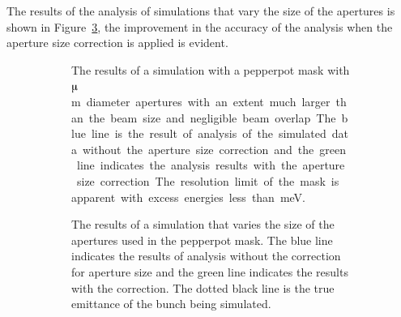 The results of the analysis of simulations that vary the size of the apertures is shown in Figure~\ref{figure:aperture_size_sim}, the improvement in the accuracy of the analysis when the aperture size correction is applied is evident.

\begin{figure}
\begin{subfigure}[b]{\textwidth}
    \center
    
    \caption[Results of a simulation investigating the efficacy of the aperture size correction for various electron excess energies.]{The results of a simulation with a pepperpot mask with \unit[50]{$\muup$m} diameter apertures with an extent much larger than the beam size and negligible beam overlap. The blue line is the result of analysis of the simulated data without the aperture size correction and the green line indicates the analysis results with the aperture size correction. The resolution limit of the mask is apparent with excess energies less than \unit[10]{meV}.}
    \label{figure:wavelength_sim}
\end{subfigure}

\begin{subfigure}[b]{\textwidth}
    \center
    
    \caption[Results of a simulation investigating the efficacy of the aperture size correction for various aperture sizes.]{The results of a simulation that varies the size of the apertures used in the pepperpot mask. The blue line indicates the results of analysis without the correction for aperture size and the green line indicates the results with the correction. The dotted black line is the true emittance of the bunch being simulated.}
    \label{figure:aperture_size_sim}
\end{subfigure}
    \caption[Results of a simulations investigating the efficacy of the aperture size correction for various excess energies and aperture sizes.]{}
\end{figure}

